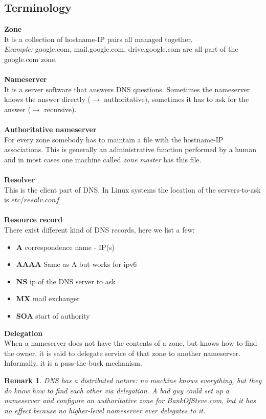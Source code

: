\documentclass[10pt,a4paper]{book}
\newtheorem{remark}{Remark}
\begin{document}
\subsection{Terminology}
\textbf{Zone}\\
It is a collection of hostname-IP pairs all managed together.\\
\emph{Example:} google.com, mail.google.com, drive.google.com are all part of the google.com zone.\\\\
\textbf{Nameserver}\\
It is a server software that answers DNS questions. Sometimes the nameserver knows the answer directly ($\to$ authoritative), sometimes it has to ask for the answer ($\to$ recursive).\\\\
\textbf{Authoritative nameserver}\\
For every zone somebody has to maintain a file with the hostname-IP associations. This is generally an administrative function performed by a human and in most cases one machine called \emph{zone master} has this file.\\\\
\textbf{Resolver}\\
This is the client part of DNS. In Linux systems the location of the servers-to-ask is $etc/resolv.conf$\\\\
\textbf{Resource record}\\
There exist different kind of DNS records, here we list a few:
\begin{itemize}%
\item \textbf{A} correspondence name - IP(s)
\item \textbf{AAAA} Same as A but works for ipv6
\item \textbf{NS} ip of the DNS server to ask
\item \textbf{MX} mail exchanger
\item \textbf{SOA} start of authority
\end{itemize}
\textbf{Delegation}\\
When a nameserver does not have the contents of a zone, but knows how to find the owner, it is said to delegate service of that zone to another nameserver. Informally, it is a pass-the-buck mechanism.
\begin{remark}
DNS has a distributed nature: no machine knows everything, but they do know how to find each other via delegation. A bad guy could set up a nameserver and configure an authoritative zone for BankOfSteve.com, but it has no effect because no higher-level nameserver ever delegates to it. 
\end{remark}
\end{document}
